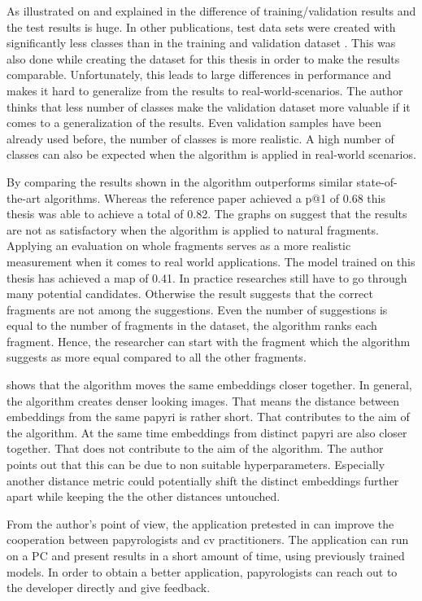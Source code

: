 \noindent As illustrated on  and explained in  the difference of training/validation results and the test results is huge. In other publications, test data sets were created with significantly less classes than in the training and validation dataset \cite{Pirrone21}. This was also done while creating the dataset for this thesis in order to make the results comparable. Unfortunately, this leads to large differences in performance and makes it hard to generalize from the results to real-world-scenarios. The author thinks that less number of classes make the validation dataset more valuable if it comes to a generalization of the results. Even validation samples have been already used before, the number of classes is more realistic. A high number of classes can also be expected when the algorithm is applied in real-world scenarios.

\noindent By comparing the results shown in  the algorithm outperforms similar state-of-the-art algorithms. Whereas the reference paper achieved a \ac{p@1} of 0.68 this thesis was able to achieve a total of 0.82. The graphs on  suggest that the results are not as satisfactory when the algorithm is applied to natural fragments. Applying an evaluation on whole fragments serves as a more realistic measurement when it comes to real world applications. The model trained on this thesis has achieved a \ac{map} of 0.41. In practice researches still have to go through many potential candidates. Otherwise the result suggests that the correct fragments are not among the suggestions. Even the number of suggestions is equal to the number of fragments in the dataset, the algorithm ranks each fragment. Hence, the researcher can start with the fragment which the algorithm suggests as more equal compared to all the other fragments.

\noindent {} shows that the algorithm moves the same embeddings closer together. In general, the algorithm creates denser looking images. That means the distance between embeddings from the same papyri is rather short. That contributes to the aim of the algorithm. At the same time embeddings from distinct papyri are also closer together. That does not contribute to the aim of the algorithm. The author points out that this can be due to non suitable hyperparameters. Especially another distance metric could potentially shift the distinct embeddings further apart while keeping the the other distances untouched.

\noindent From the author's point of view, the application pretested in  can improve the cooperation between papyrologists and \ac{cv} practitioners. The application can run on a PC and present results in a short amount of time, using previously trained models. In order to obtain a better application, papyrologists can reach out to the developer directly and give feedback.

